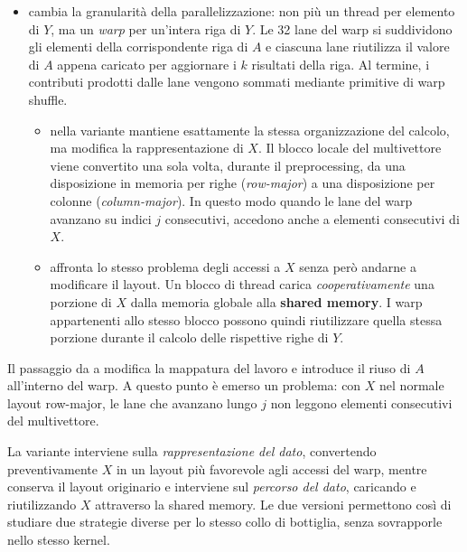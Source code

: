 \begin{itemize}
    \item \textbf{} cambia la granularità della
    parallelizzazione: non più un thread per elemento di $Y$, ma un
    \emph{warp} per un'intera riga di $Y$. Le 32 lane del warp si
    suddividono gli elementi della corrispondente riga di $A$ e ciascuna
    lane riutilizza il valore di $A$ appena caricato per aggiornare i
    $k$ risultati della riga. Al termine, i contributi prodotti dalle lane
    vengono sommati mediante primitive di warp shuffle.

    \begin{itemize}

    \item \textbf{} nella variante  mantiene
    esattamente la stessa organizzazione del calcolo, ma modifica la
    rappresentazione di $X$. Il blocco locale del multivettore viene
    convertito una sola volta, durante il preprocessing, da una disposizione
    in memoria per righe (\emph{row-major}) a una disposizione per colonne (\emph{column-major}).
    In questo modo quando le lane
    del warp avanzano su indici $j$ consecutivi, accedono anche a elementi
    consecutivi di $X$.

    \item \textbf{} affronta lo stesso problema degli
    accessi a $X$ senza però andarne a modificare il layout.
    Un blocco di thread carica
    \emph{cooperativamente} una porzione di $X$ dalla memoria globale alla
    \textbf{shared memory}. I warp appartenenti allo stesso blocco possono quindi
    riutilizzare quella stessa porzione durante il calcolo delle rispettive
    righe di $Y$.

    \end{itemize}
\end{itemize}

Il passaggio da  a
 modifica la mappatura del lavoro e introduce il
riuso di $A$ all'interno del warp. A questo punto è emerso un problema:
con $X$ nel normale layout row-major, le lane che avanzano lungo $j$ non
leggono elementi consecutivi del multivettore.

La variante  interviene sulla \emph{rappresentazione
del dato}, convertendo preventivamente $X$ in un layout più favorevole agli
accessi del warp, mentre  conserva il layout
originario e interviene sul \emph{percorso del dato}, caricando e riutilizzando
$X$ attraverso la shared memory. Le due versioni permettono così di studiare
due strategie diverse per lo stesso collo di bottiglia, senza sovrapporle
nello stesso kernel.

